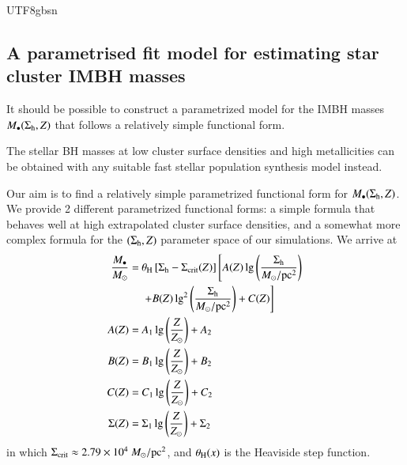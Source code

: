 \documentclass[trackchanges, twocolappendix, twocolumn]{aastex701}
\begin{document}
\begin{CJK*}{UTF8}{gbsn}
\subsection{A parametrised fit model for estimating star cluster IMBH masses}

It should be possible to construct a parametrized model for the IMBH masses $M_\bullet (\Sigma_{\rm h}, Z)$ that follows a relatively simple functional form.

The stellar BH masses at low cluster surface densities and high metallicities can be obtained with any suitable fast stellar population synthesis model instead.

Our aim is to find a relatively simple parametrized functional form for $M_\bullet (\Sigma_{\rm h}, Z)$. We provide 2 different parametrized functional forms: a simple formula that behaves well at high extrapolated cluster surface densities, and a somewhat more complex formula for the $(\Sigma_{\rm h}, Z)$ parameter space of our simulations. We arrive at
\begin{align}
\dfrac{M_\bullet}{M_\odot} = &~ \theta_{\rm H} \left[ \Sigma_{\rm h} - \Sigma_{\rm crit}(Z) \right] \left[ A(Z) \lg \left( \dfrac{\Sigma_{\rm h}}{M_\odot / {\rm pc}^2} \right) \right. \notag \label{eq:fit1} \\
&~ \left. + B(Z) \lg^2 \left( \dfrac{\Sigma_{\rm h}}{M_\odot / {\rm pc}^2} \right) + C(Z) \right] \\
A (Z) = &~ A_1 \lg \left( \dfrac{Z}{Z_\odot} \right) + A_2 \label{eq:A_Z} \\
B (Z) = &~ B_1 \lg \left( \dfrac{Z}{Z_\odot} \right) + B_2 \label{eq:B_Z} \\
C (Z) = &~ C_1 \lg \left( \dfrac{Z}{Z_\odot} \right) + C_2 \label{eq:C_Z} \\
\Sigma (Z) = &~ \Sigma_1 \lg \left( \dfrac{Z}{Z_\odot} \right) + \Sigma_2 \label{eq:Sigma_Z}
\end{align}
in which $\Sigma_{\rm crit} \approx 2.79 \times 10^4~M_\odot / {\rm pc}^2$, and $\theta_{\rm H} (x)$ is the Heaviside step function.


\end{CJK*}
\end{document}
